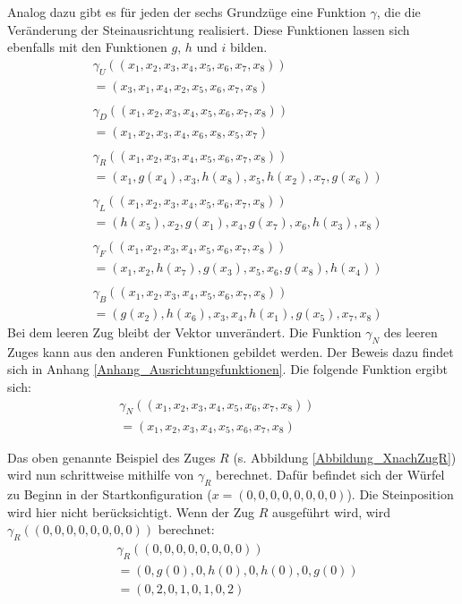 \documentclass[12pt,a4paper, usenames, dvipsnames]{article}
\theoremstyle{mystyle}
\theoremstyle{definition}
\begin{document}
Analog dazu gibt es für jeden der sechs Grundzüge eine Funktion $\gamma$, die die Veränderung der Steinausrichtung realisiert. Diese Funktionen lassen sich ebenfalls mit den Funktionen $g$, $h$ und $i$ bilden.
\begin{align*}
& \gamma_U \left( (x_1, x_2, x_3, x_4, x_5, x_6, x_7, x_8  ) \right) \\ 
& =  \left( x_3, x_1, x_4, x_2, x_5, x_6, x_7, x_8 \right) \\
\\ 
& \gamma_D \left( (x_1, x_2, x_3, x_4, x_5, x_6, x_7, x_8  ) \right) \\ 
& =  \left( x_1, x_2, x_3, x_4, x_6, x_8, x_5, x_7 \right) \\
\\
& \gamma_R \left( (x_1, x_2, x_3, x_4, x_5, x_6, x_7, x_8  ) \right) \\ 
& =  \left( x_1, g(x_4), x_3, h(x_8), x_5, h(x_2), x_7, g(x_6) \right) \\ 
\\
& \gamma_L \left( (x_1, x_2, x_3, x_4, x_5, x_6, x_7, x_8  ) \right) \\ 
& =   (h(x_5), x_2, g(x_1), x_4, g(x_7), x_6, h(x_3), x_8) \\ 
\\
& \gamma_F \left( (x_1, x_2, x_3, x_4, x_5, x_6, x_7, x_8  ) \right) \\ 
& =  \left( x_1, x_2, h(x_7), g(x_3), x_5, x_6, g(x_8), h(x_4) \right) \\
\\
& \gamma_B \left( (x_1, x_2, x_3, x_4, x_5, x_6, x_7, x_8  ) \right) \\ 
& =  \left( g(x_2), h(x_6), x_3, x_4, h(x_1), g(x_5), x_7, x_8 \right)
\end{align*}
Bei dem leeren Zug bleibt der Vektor unverändert. Die Funktion $\gamma_N$ des leeren Zuges kann aus den anderen Funktionen gebildet werden. Der Beweis dazu findet sich in Anhang \ref{Anhang_Ausrichtungsfunktionen}. Die folgende Funktion ergibt sich:
\begin{align*}
& \gamma_N \left( (x_1, x_2, x_3, x_4, x_5, x_6, x_7, x_8  ) \right) \ \ \ \ \ \ \ \ \ \ \ \ \ \ \ \\ 
& =  \left( x_1, x_2, x_3, x_4, x_5, x_6, x_7, x_8 \right)
\end{align*}

Das oben genannte Beispiel des Zuges $R$ (s. Abbildung \ref{Abbildung_XnachZugR}) wird nun schrittweise mithilfe von $\gamma_R$ berechnet. Dafür befindet sich der Würfel zu Beginn in der Startkonfiguration ($x = (0, 0, 0, 0, 0, 0, 0, 0)$). Die Steinposition wird hier nicht berücksichtigt. Wenn der Zug $R$ ausgeführt wird, wird $\gamma_R( (0, 0, 0, 0, 0, 0, 0, 0) )$ berechnet:
\begin{align*}
& \gamma_R( (0, 0, 0, 0, 0, 0, 0, 0) ) \\
& = (0, g(0), 0, h(0), 0, h(0), 0, g(0)) \\
& = (0, 2, 0, 1, 0, 1, 0, 2)
\end{align*}
\end{document}
